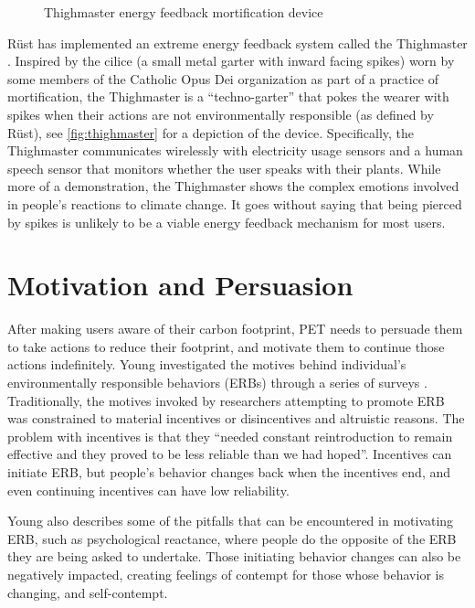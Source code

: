 \begin{figure}[htbp]
	\begin{center}
		\caption{Thighmaster energy feedback mortification device}
		\label{fig:thighmaster}
 	\end{center}
\end{figure}

R\"{u}st has implemented an extreme energy feedback system called the Thighmaster \cite{Rust2008Thighmaster-web}. Inspired by the cilice (a small metal garter with inward facing spikes) worn by some members of the Catholic Opus Dei organization as part of a practice of mortification, the Thighmaster is a ``techno-garter'' that pokes the wearer with spikes when their actions are not environmentally responsible (as defined by R\"{u}st), see \autoref{fig:thighmaster} for a depiction of the device. Specifically, the Thighmaster communicates wirelessly with electricity usage sensors and a human speech sensor that monitors whether the user speaks with their plants. While more of a demonstration, the Thighmaster shows the complex emotions involved in people's reactions to climate change. It goes without saying that being pierced by spikes is unlikely to be a viable energy feedback mechanism for most users.


\section{Motivation and Persuasion}

After making users aware of their carbon footprint, PET needs to persuade them to take actions to reduce their footprint, and motivate them to continue those actions indefinitely. Young investigated the motives behind individual's environmentally responsible behaviors (ERBs) through a series of surveys \cite{Young:2000fv}. Traditionally, the motives invoked by researchers attempting to promote ERB was constrained to material incentives or disincentives and altruistic reasons. The problem with incentives is that they ``needed constant reintroduction to remain effective and they proved to be less reliable than we had hoped''. Incentives can initiate ERB, but people's behavior changes back when the incentives end, and even continuing incentives can have low reliability.

Young also describes some of the pitfalls that can be encountered in motivating ERB, such as psychological reactance, where people do the opposite of the ERB they are being asked to undertake. Those initiating behavior changes can also be negatively impacted, creating feelings of contempt for those whose behavior is changing, and self-contempt.

